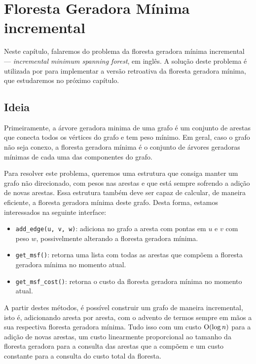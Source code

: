 
\chapter{Floresta Geradora Mínima incremental}
\label{cap:incremental-msf}

Neste capítulo, falaremos do problema da floresta geradora mínima incremental --- \emph{incremental minimum spanning forest}, em inglês. A solução deste problema é utilizada por \citet{10.1093/comjnl/bxaa135} para implementar a versão retroativa da floresta geradora mínima, que estudaremos no próximo capítulo.


\section{Ideia}
\label{sec:imsf-ideia}

Primeiramente, a árvore geradora minima de uma grafo é um conjunto de arestas que conecta todos os vértices do grafo e tem peso mínimo. Em geral, caso o grafo não seja conexo, a floresta geradora mínima é o conjunto de árvores geradoras mínimas de cada uma das componentes do grafo.

Para resolver este problema, queremos uma estrutura que consiga manter um grafo não direcionado, com pesos nas arestas e que está sempre sofrendo a adição de novas arestas. Essa estrutura também deve ser capaz de calcular, de maneira eficiente, a floresta geradora mínima deste grafo. Desta forma, estamos interessados na seguinte interface:

\begin{itemize}
    \item \texttt{add\_edge(u, v, w)}: adiciona no grafo a aresta com pontas em $u$ e $v$ com peso $w$, possivelmente alterando a floresta geradora mínima.
    \item \texttt{get\_msf()}: retorna uma lista com todas as arestas que compõem a floresta geradora mínima no momento atual.
    \item \texttt{get\_msf\_cost()}: retorna o custo da floresta geradora mínima no momento atual.
\end{itemize}

A partir destes métodos, é possível construir um grafo de maneira incremental, isto é, adicionando aresta por aresta, com o advento de termos sempre em mãos a sua respectiva floresta geradora mínima. Tudo isso com um custo $\mathrm{O} (\log n)$ para a adição de novas arestas, um custo linearmente proporcional ao tamanho da floresta geradora para a consulta das arestas que a compõem e um custo constante para a consulta do custo total da floresta.

